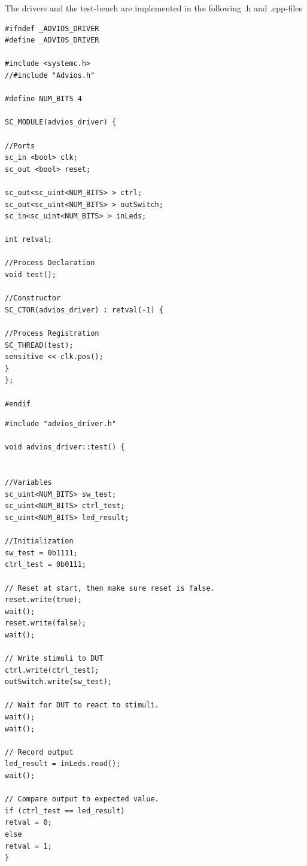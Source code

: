 The drivers and the test-bench are implemented in the following .h and .cpp-files
\begin{lstlisting}
#ifndef _ADVIOS_DRIVER
#define _ADVIOS_DRIVER

#include <systemc.h>
//#include "Advios.h"

#define NUM_BITS 4

SC_MODULE(advios_driver) {

//Ports
sc_in <bool> clk;
sc_out <bool> reset;

sc_out<sc_uint<NUM_BITS> > ctrl;
sc_out<sc_uint<NUM_BITS> > outSwitch;
sc_in<sc_uint<NUM_BITS> > inLeds;

int retval;

//Process Declaration
void test();

//Constructor
SC_CTOR(advios_driver) : retval(-1) {

//Process Registration
SC_THREAD(test);
sensitive << clk.pos();
}
};

#endif
\end{lstlisting}
\label{lst:advios_driver_h}

\begin{lstlisting}
#include "advios_driver.h"

void advios_driver::test() {


//Variables
sc_uint<NUM_BITS> sw_test;
sc_uint<NUM_BITS> ctrl_test;
sc_uint<NUM_BITS> led_result;

//Initialization
sw_test = 0b1111;
ctrl_test = 0b0111;

// Reset at start, then make sure reset is false.
reset.write(true);
wait();
reset.write(false);
wait();

// Write stimuli to DUT
ctrl.write(ctrl_test);
outSwitch.write(sw_test);

// Wait for DUT to react to stimuli.
wait();
wait();

// Record output
led_result = inLeds.read();
wait();

// Compare output to expected value.
if (ctrl_test == led_result)
retval = 0;
else
retval = 1;
}
\end{lstlisting}
\label{lst:advios_driver_cpp}

